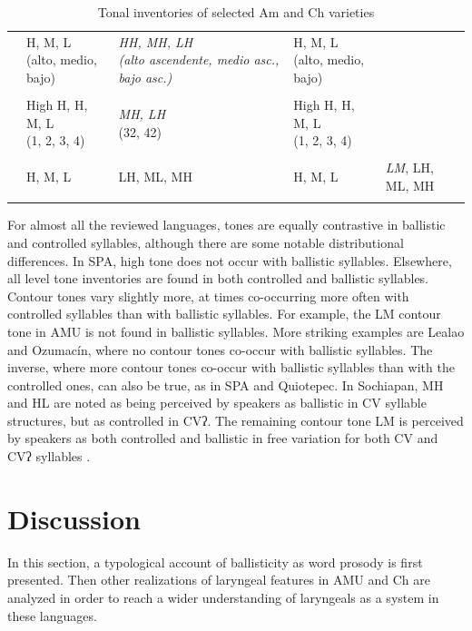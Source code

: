 \documentclass[output=paper]{langscibook}
\begin{document}
\begin{table}
\begin{tabularx}{\textwidth}{l  QQQQ}
& {H, M, L
\newline ({{alto, medio, bajo}})}
& \textit{HH, MH, LH
\newline ({alto ascendente, medio asc., bajo asc.})}
& {H, M, L
\newline ({{alto, medio, bajo}})} & \\

\tablevspace
{}\\
& {High H, H, M, L\newline (1, 2, 3, 4)} & {\textit{MH, LH}\newline (32, 42)} & {High H, H, M, L\newline (1, 2, 3, 4)} & \\

\tablevspace
{}\\
& {H, M, L} & {LH, ML, MH} & {H, M, L} & {\textit{LM}, LH, ML, MH}\\
\lspbottomrule
\end{tabularx}
\caption{Tonal inventories of selected Am and Ch varieties}
\label{tab:dobui:12}
\end{table}

For almost all the reviewed languages, tones are equally contrastive in ballistic and controlled syllables, although there are some notable distributional differences. In SPA, high tone does not occur with ballistic syllables. Elsewhere, all level tone inventories are found in both controlled and ballistic syllables. Contour tones vary slightly more, at times co-occurring more often with controlled syllables than with ballistic syllables. For example, the LM contour tone in AMU is not found in ballistic syllables. More striking examples are Lealao and Ozumacín, where no contour tones co-occur with ballistic syllables. The inverse, where more contour tones co-occur with ballistic syllables than with the controlled ones, can also be true, as in SPA and Quiotepec. In Sochiapan, MH and HL are noted as being perceived by speakers as ballistic in CV syllable structures, but as controlled in CVʔ. The remaining contour tone LM is perceived by speakers as both controlled and ballistic in free variation for both CV and CVʔ syllables \citep{Foris1973}.

\newpage
\section{Discussion}\label{sec:dobui:4}
\largerpage
In this section, a typological account of ballisticity as word prosody is first presented. Then other realizations of laryngeal features in AMU and Ch are analyzed in order to reach a wider understanding of laryngeals as a system in these languages.
\end{document}
